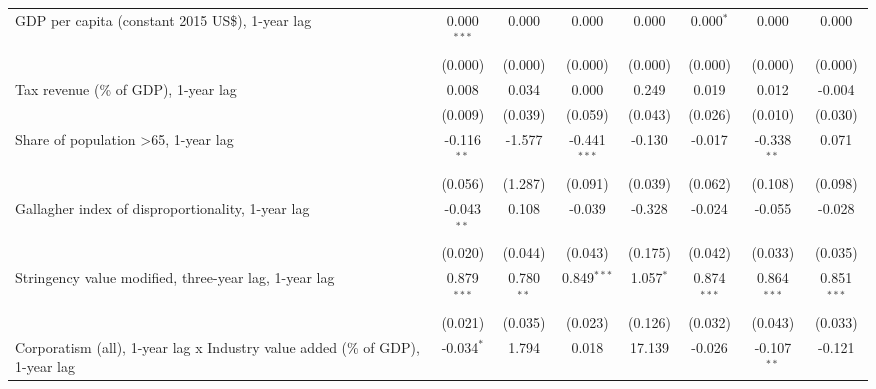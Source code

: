 \begin{table}[htbp]
\begin{tabular}{lccccccc}
      GDP per capita (constant 2015 US\$), 1-year lag                               & 0.000$^{***}$ & 0.000                     & 0.000          & 0.000            & 0.000$^{*}$     & 0.000           & 0.000\\   
                                                                                    & (0.000)       & (0.000)                   & (0.000)        & (0.000)          & (0.000)         & (0.000)         & (0.000)\\   
      Tax revenue (\% of GDP), 1-year lag                                           & 0.008         & 0.034                     & 0.000          & 0.249            & 0.019           & 0.012           & -0.004\\   
                                                                                    & (0.009)       & (0.039)                   & (0.059)        & (0.043)          & (0.026)         & (0.010)         & (0.030)\\   
      Share of population >65, 1-year lag                                           & -0.116$^{**}$ & -1.577                    & -0.441$^{***}$ & -0.130           & -0.017          & -0.338$^{**}$   & 0.071\\   
                                                                                    & (0.056)       & (1.287)                   & (0.091)        & (0.039)          & (0.062)         & (0.108)         & (0.098)\\   
      Gallagher index of disproportionality, 1-year lag                             & -0.043$^{**}$ & 0.108                     & -0.039         & -0.328           & -0.024          & -0.055          & -0.028\\   
                                                                                    & (0.020)       & (0.044)                   & (0.043)        & (0.175)          & (0.042)         & (0.033)         & (0.035)\\   
      Stringency value modified, three-year lag, 1-year lag                         & 0.879$^{***}$ & 0.780$^{**}$              & 0.849$^{***}$  & 1.057$^{*}$      & 0.874$^{***}$   & 0.864$^{***}$   & 0.851$^{***}$\\   
                                                                                    & (0.021)       & (0.035)                   & (0.023)        & (0.126)          & (0.032)         & (0.043)         & (0.033)\\   
      Corporatism (all), 1-year lag x Industry value added (\% of GDP), 1-year lag  & -0.034$^{*}$  & 1.794                     & 0.018          & 17.139           & -0.026          & -0.107$^{**}$   & -0.121\\   

\end{tabular}
\end{table}
